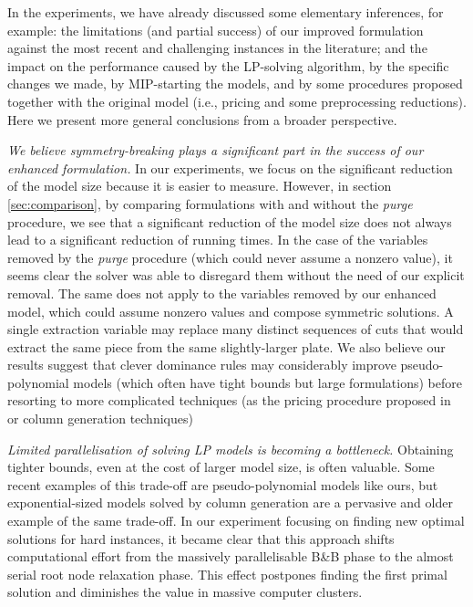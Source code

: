\documentclass[ppgc,prop-tese,english,formais,babel]{iiufrgs}
\begin{document}
In the experiments, we have already discussed some elementary inferences, for example: the limitations (and partial success) of our improved formulation against the most recent and challenging instances in the literature; and the impact on the performance caused by the LP-solving algorithm, by the specific changes we made, by MIP-starting the models, and by some procedures proposed together with the original model (i.e., pricing and some preprocessing reductions).
Here we present more general conclusions from a broader perspective.

\emph{We believe symmetry-breaking plays a significant part in the success of our enhanced formulation.}
In our experiments, we focus on the significant reduction of the model size because it is easier to measure.
However, in section \cref{sec:comparison}, by comparing formulations with and without the \emph{purge} procedure, we see that a significant reduction of the model size does not always lead to a significant reduction of running times.
In the case of the variables removed by the \emph{purge} procedure (which could never assume a nonzero value), it seems clear the solver was able to disregard them without the need of our explicit removal.
The same does not apply to the variables removed by our enhanced model, which could assume nonzero values and compose symmetric solutions.
A single extraction variable may replace many distinct sequences of cuts that would extract the same piece from the same slightly-larger plate.
We also believe our results suggest that clever dominance rules may considerably improve pseudo-polynomial models (which often have tight bounds but large formulations) before resorting to more complicated techniques (as the pricing procedure proposed in~\citet{furini:2016} or column generation techniques)

\emph{Limited parallelisation of solving LP models is becoming a bottleneck.}
Obtaining tighter bounds, even at the cost of larger model size, is often valuable.
Some recent examples of this trade-off are pseudo-polynomial models like ours, but exponential-sized models solved by column generation are a pervasive and older example of the same trade-off.
In our experiment focusing on finding new optimal solutions for hard instances, it became clear that this approach shifts computational effort from the massively parallelisable B\&B phase to the almost serial root node relaxation phase.
This effect postpones finding the first primal solution and diminishes the value in massive computer clusters.
\end{document}
